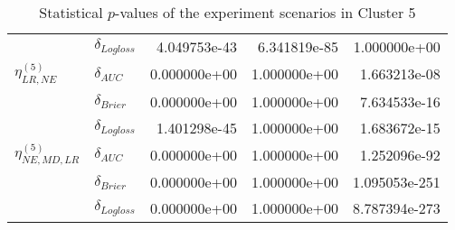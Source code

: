 \begin{table}[!h]
\begin{tabular}{l|lrrr}
                              & $\delta_{Logloss}$ &           4.049753e-43 &     6.341819e-85 &             1.000000e+00 \\
    $\eta^{(5)}_{LR, NE}$ & $\delta_{AUC}$ &           0.000000e+00 &     1.000000e+00 &             1.663213e-08 \\
                              & $\delta_{Brier}$ &           0.000000e+00 &     1.000000e+00 &             7.634533e-16 \\
                              & $\delta_{Logloss}$ &           1.401298e-45 &     1.000000e+00 &             1.683672e-15 \\
    $\eta^{(5)}_{NE, MD, LR}$ & $\delta_{AUC}$ &           0.000000e+00 &     1.000000e+00 &             1.252096e-92 \\
                              & $\delta_{Brier}$ &           0.000000e+00 &     1.000000e+00 &            1.095053e-251 \\
                              & $\delta_{Logloss}$ &           0.000000e+00 &     1.000000e+00 &            8.787394e-273 \\
    \bottomrule
    \end{tabular}
    \caption{Statistical $p$-values of the experiment scenarios in Cluster 5}
    \end{table}
    
